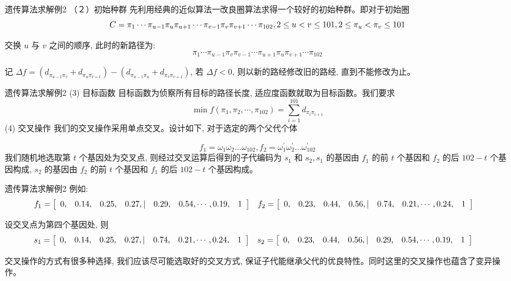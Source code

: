 \documentclass[xcolor=table,dvipsnames,svgnames,aspectratio=169,fontset=ubuntu]{ctexbeamer}
\let\\\relax
\let\quad\relax
\begin{document}
\begin{frame}{遗传算法求解例2}
  （２）初始种群
  \vskip 5pt
  先利用经典的近似算法一改良圈算法求得一个较好的初始种群。即对于初始圈
  $$
  C=\pi_1 \cdots \pi_{u-1} \pi_u \pi_{u+1} \cdots \pi_{v-1} \pi_v \pi_{v+1} \cdots \pi_{102}, \quad 2 \leq u<v \leq 101, \quad 2 \leq \pi_u<\pi_v \leq 101
  $$
  
  交换 $u$ 与 $v$ 之间的顺序, 此时的新路径为:
  $$
  \pi_1 \cdots \pi_{u-1} \pi_v \pi_{v-1} \cdots \pi_{u+1} \pi_u \pi_{v+1} \cdots \pi_{102}
  $$
  
  记 $\Delta f=\left(d_{\pi_{u-1} \pi_v}+d_{\pi_u \pi_{v+1}}\right)-\left(d_{\pi_{u-1} \pi_u}+d_{\pi_v \pi_{v+1}}\right)$, 若 $\Delta f<0$, 则以新的路经修改旧的路经, 直到不能修改为止。
\end{frame}

\begin{frame}{遗传算法求解例2}
  (3) 目标函数
\vskip 5pt
目标函数为侦察所有目标的路径长度, 适应度函数就取为目标函数。我们要求
$$
\min f\left(\pi_1, \pi_2, \cdots, \pi_{102}\right)=\sum_{i=1}^{101} d_{\pi_i \pi_{i+1}}
$$
(4) 交叉操作
\vskip 5pt
我们的交叉操作采用单点交叉。设计如下, 对于选定的两个父代个体 

$$f_1=\omega_1 \omega_2 \ldots \omega_{102}, f_2=\omega_1^{\prime} \omega_2^{\prime} \ldots \omega_{102}^{\prime}$$
\vskip 5pt
我们随机地选取第 $t$ 个基因处为交叉点, 则经过交叉运算后得到的子代编码为 $s_1$ 和 $s_2, s_1$ 的基因由 $f_1$ 的前 $t$ 个基因和 $f_2$ 的后 $102-t$ 个基因构成, $s_2$ 的基因由 $f_2$ 的前 $t$ 个基因和 $f_1$ 的后 $102-t$ 个基因构成。
\end{frame}

\begin{frame}{遗传算法求解例2}
  例如:
  $$
\begin{aligned}
& f_1=\left[\begin{array}{lllllll}
0, & 0.14, & 0.25, & 0.27, \mid & 0.29, & 0.54, \cdots, 0.19, & 1
\end{array}\right] \\
& f_2=\left[\begin{array}{lllllll}
0, & 0.23, & 0.44, & 0.56, \mid & 0.74, & 0.21, \cdots, 0.24, &1
\end{array}\right] \\
&
\end{aligned}
$$

设交叉点为第四个基因处, 则
$$
\begin{aligned}
& s_1=\left[\begin{array}{lllllll}
0, & 0.14, & 0.25, & 0.27, \mid & 0.74, & 0.21, \cdots, 0.24,&1
\end{array}\right] \\
& s_2=\left[\begin{array}{lllllll}
0, & 0.23, & 0.44, & 0.56, \mid & 0.29, & 0.54, \cdots, 0.19,&1
\end{array}\right] \\
&
\end{aligned}
$$

交叉操作的方式有很多种选择, 我们应该尽可能选取好的交叉方式, 保证子代能继承父代的优良特性。同时这里的交叉操作也蕴含了变异操作。
\end{frame}
\end{document}
